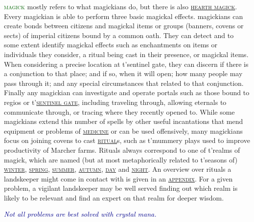 \documentclass[twoside,11pt,b5paper,twocolumn]{scrbook}
\newcommand{\estcab}[1]{\textsc{\textcolor{marron}{#1}}}
\newcommand{\keyword}[1]{\textcolor{darkgreen}{#1}}
\renewcommand{\paragraph}[1]{\par\noindent\markboth{#1}{#1}\estcab{\keyword{#1}}\label{#1} }
\newcommand{\see}[1]{{\estcab{\hyperref[#1]{#1}}}}
\newcommand{\proverb}[1]{\par \textcolor{darkblue}{\itshape #1}}
\begin{document}
\paragraph{magick} mostly refers to what magickians do, but there is also \see{hearth magick}. Every magickian is able to perform three basic magickal effects. magickians can create bonds between citizens and magickal items or groups (banners, covens or sects) of imperial citizens bound by a common oath. They can detect and to some extent identify magickal effects such as enchantments on items or individuals they consider, a ritual being cast in their presence, or magickal items. When considering a precise location at t'sentinel gate, they can discern if there is a conjunction to that place; and if so, when it will open; how many people may pass through it; and any special circumstances that related to that conjunction. Finally any magickian can investigate and operate portals such as those bound to regios or t'\see{sentinel gate}, including traveling through, allowing eternals to communicate through, or tracing where they recently opened to. While some magickians extend this number of spells by other useful incantations that mend equipment or problems of \see{medicine} or can be used offensively, many magickians focus on joining covens to cast \see{ritual}s, such as t'mummery plays used to improve productivity of Marcher farms. Rituals always correspond to one of t'realms of magick, which are named (but at most metaphorically related to t'seasons of) \see{winter}, \see{spring}, \see{summer}, \see{autumn}, \see{day} and \see{night}. An overview over rituals a landskeeper might come in contact with is given in an \see{appendix}. For a given problem, a vigilant landskeeper may be well served finding out which realm is likely to be relevant and find an expert on that realm for deeper wisdom. \proverb{Not all problems are best solved with crystal mana.}
\end{document}
